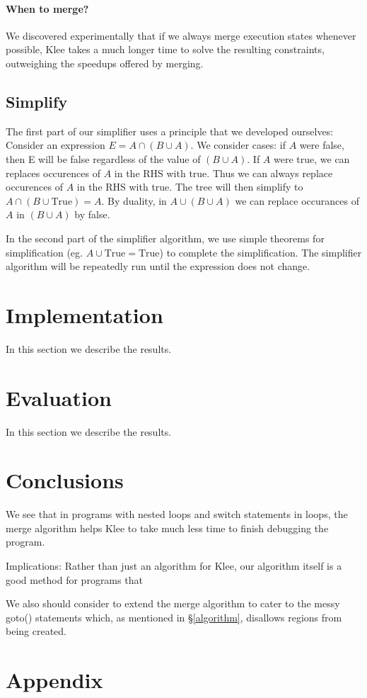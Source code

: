 \documentclass[12pt,a4paper]{article}
\begin{document}
\paragraph{When to merge?}
We discovered experimentally that if we always merge execution states whenever possible, Klee takes a much longer time to solve the resulting constraints, outweighing the speedups offered by merging.

\subsection{Simplify}
The first part of our simplifier uses a principle that we developed ourselves:
Consider an expression $E = A\cap(B\cup A)$. We consider cases: if $A$ were false, then E will be false regardless of the value of $(B\cup A)$. If $A$ were true, we can replaces occurences of $A$ in the RHS with true. Thus we can always replace occurences of $A$ in the RHS with true. The tree will then simplify to $A\cap(B\cup \text{True}) = A$. By duality, in $A\cup(B\cup A)$ we can replace occurances of $A$ in $(B\cup A)$ by false.

In the second part of the simplifier algorithm, we use simple theorems for simplification (eg. $A\cup \text{True} = \text{True}$) to complete the simplification. The simplifier algorithm will be repeatedly run until the expression does not change.

\section{Implementation}\label{implementation}
In this section we describe the results.





\section{Evaluation}\label{evaluation}
In this section we describe the results.

\section{Conclusions}\label{conclusions}
We see that in programs with nested loops and switch statements in loops, the merge algorithm helps Klee to take much less time to finish debugging the program.

Implications: Rather than just an algorithm for Klee, our algorithm itself is a good method for programs that 

We also should consider to extend the merge algorithm to cater to the messy goto() statements which, as mentioned in \S\ref{algorithm}, disallows regions from being created. 


%
%





\section{Appendix}
\end{document}
